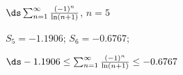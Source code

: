 {$\ds \sum_{n=1}^\infty \frac{(-1)^n}{\ln (n+1)}$, \quad $n=5$
}
{$S_5 = -1.1906$; $S_{6} = -0.6767$;

$\ds -1.1906 \leq \sum_{n=1}^\infty \frac{(-1)^n}{\ln (n+1)} \leq -0.6767$
}